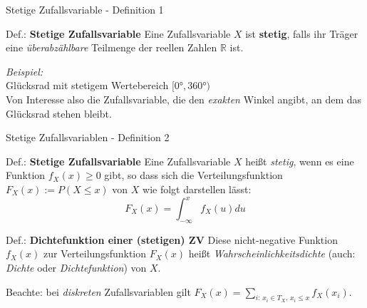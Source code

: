 \documentclass[
  10pt,
  ignorenonframetext,
]{beamer}
\begin{document}
\begin{frame}{Stetige Zufallsvariable - Definition 1}
\protect\hypertarget{stetige-zufallsvariable---definition-1}{}
\begin{block}{Def.: \textbf{Stetige Zufallsvariable}}
\protect\hypertarget{def.-stetige-zufallsvariable}{}
Eine Zufallsvariable \(X\) ist \textbf{stetig}, falls ihr Träger eine
\emph{überabzählbare} Teilmenge der reellen Zahlen \(\mathbb{R}\) ist.
\end{block}

\hfill\break

\emph{Beispiel:}\\
Glücksrad mit stetigem Wertebereich \([0°, 360°)\)\\
Von Interesse also die Zufallsvariable, die den \emph{exakten} Winkel
angibt, an dem das Glücksrad stehen bleibt.
\end{frame}

\begin{frame}{Stetige Zufallsvariablen - Definition 2}
\protect\hypertarget{stetige-zufallsvariablen---definition-2}{}
\begin{block}{Def.: \textbf{Stetige Zufallsvariable}}
\protect\hypertarget{def.-stetige-zufallsvariable-1}{}
Eine Zufallsvariable \(X\) heißt \emph{stetig}, wenn es eine Funktion
\(f_X(x) \geq 0\) gibt, so dass sich die Verteilungsfunktion
\(F_X(x) := P(X \leq x)\) von \(X\) wie folgt darstellen lässt:
\[F_X(x) = \int_{-\infty}^x f_X(u) du\]
\end{block}

\begin{block}{Def.: \textbf{Dichtefunktion einer (stetigen) ZV}}
\protect\hypertarget{def.-dichtefunktion-einer-stetigen-zv}{}
Diese nicht-negative Funktion \(f_X(x)\) zur Verteilungsfunktion
\(F_X(x)\) heißt \emph{Wahrscheinlichkeitsdichte} (auch: \emph{Dichte}
oder \emph{Dichtefunktion}) von \(X\).
\end{block}

\hfill\break

Beachte: bei \emph{diskreten} Zufallsvariablen gilt
\(F_X(x) = \sum_{i:\, x_i \in T_X,\, x_i \leq x} f_X(x_i)\).
\end{frame}
\end{document}
